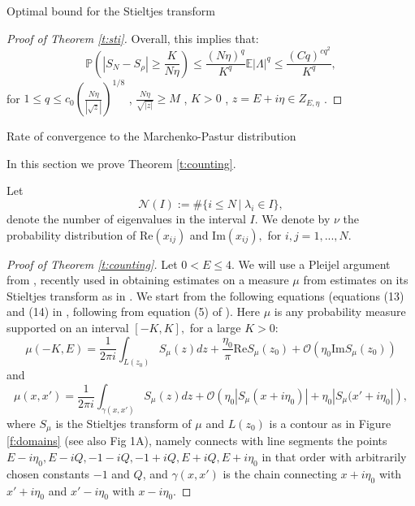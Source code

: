 \documentclass[11pt, a4paper, oneside]{book}
\numberwithin{equation}{chapter}
\newcommand{\E}{\mathbb E}
\begin{document}
\begin{section}{Optimal bound for the Stieltjes transform}
\begin{proof}[Proof of Theorem \ref{t:sti}]
Overall, this implies that:
\begin{equation}\label{e:finalLambdabound}\mathbb{P} \left( |S_{N} - S_{\rho}|\geq \frac{K}{ N\eta} \right)\leq \frac{(N\eta)^q}{K^q}\E | \Lambda|^q \leq \frac{(Cq)^{cq^2}}{K^q} ,
\end{equation}
for $1 \leq q \leq c_0 \left (\frac{N\eta}{|\sqrt{z}|} \right )^{1/8} $ , $\frac{N\eta}{\sqrt{|z|}}\geq M $ , $K>0$ , $z = E + i \eta \in Z_{E, \eta} $ .
\end{proof}
\end{section}

\begin{section}{Rate of convergence to the Marchenko-Pastur distribution}

In this section we prove Theorem \ref{t:counting}.

Let
\begin{equation}
\mathcal{N}(I) := \#\{i \leq N\,|\; \lambda_i \in I\},
\end{equation}
denote the number of eigenvalues in the interval $I.$
%
We denote by $\nu$ the probability distribution of $\mathrm{Re} (x_{ij})$ and $\mathrm{Im} (x_{ij}),$ for $i,j=1,...,N.$
%
\begin{proof}[Proof of Theorem \ref{t:counting}]
Let $0<E \leq 4$. We will use a Pleijel argument from \cite{pleijel1963theorem}, recently used in obtaining estimates on a measure $\mu$ from estimates on its Stieltjes transform as in \cite{erdHos2016fluctuations}. We start from the following equations (equations (13) and (14) in  \cite{erdHos2016fluctuations}, following from equation (5) of \cite{pleijel1963theorem}). Here $\mu$ is any probability measure supported on an interval $[-K,K],$ for a large $K>0:$
%
\begin{equation}\label{e:pleijel}
\mu(-K, E) = \frac{1}{2\pi i}\int_{L(z_0)}S_{\mu}(z)dz + \frac{\eta_0}{\pi} \mathrm{Re} S_\mu(z_0) + \mathcal{O} \left (\eta_0 \mathrm{Im} S_\mu(z_0) \right )
\end{equation}
and
\begin{equation}\label{e:pleijel2}
\mu(x, x') = \frac{1}{2\pi i}\int_{\gamma(x, x')} S_{\mu}(z)dz + \mathcal{O} \left (\eta_0 \left | S_\mu(x + i\eta_0) \right | + \eta_0 \left | S_\mu(x' + i\eta_0 \right | \right ),
\end{equation}
%
where $S_\mu$ is the Stieltjes transform of $\mu$ and $L(z_0)$ is a contour as in Figure \ref{f:domains} (see also \cite{erdHos2016fluctuations} Fig 1A), namely connects with line segments the points $E-i\eta_0, E-iQ, -1-iQ , -1+ iQ, E+ iQ, E+ i\eta_0$ in that order with arbitrarily chosen constants $-1$ and $Q$, and $\gamma(x, x')$ is the chain connecting $x+i\eta_0$ with $x'+i\eta_0$ and $x'- i\eta_0$ with  $x-i\eta_0.$


\end{proof}
\end{section}
\end{document}
